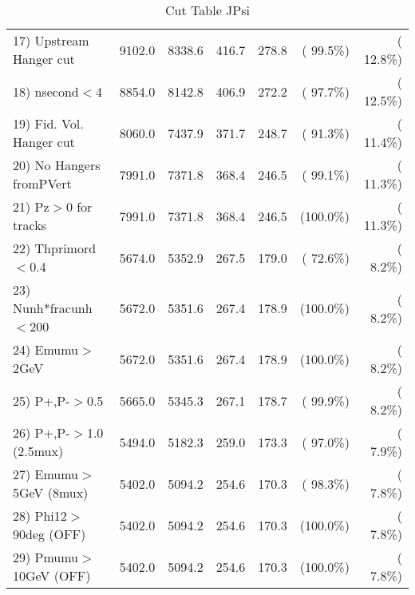 \begin{table}[h!]
\begin{tabular}{||l||r|r|r|r|r|r||}
 17) Upstream Hanger cut  &       9102.0 &       8338.6 &        416.7 &        278.8 & ( 99.5\%) & ( 12.8\%) \\
 18) nsecond$<$4          &       8854.0 &       8142.8 &        406.9 &        272.2 & ( 97.7\%) & ( 12.5\%) \\
 19) Fid. Vol. Hanger cut &       8060.0 &       7437.9 &        371.7 &        248.7 & ( 91.3\%) & ( 11.4\%) \\
 20) No Hangers fromPVert &       7991.0 &       7371.8 &        368.4 &        246.5 & ( 99.1\%) & ( 11.3\%) \\
 21) Pz$>$0 for tracks    &       7991.0 &       7371.8 &        368.4 &        246.5 & (100.0\%) & ( 11.3\%) \\
 22) Thprimord$<$0.4      &       5674.0 &       5352.9 &        267.5 &        179.0 & ( 72.6\%) & (  8.2\%) \\
 23) Nunh*fracunh$<$200   &       5672.0 &       5351.6 &        267.4 &        178.9 & (100.0\%) & (  8.2\%) \\
 24) Emumu$>$2GeV         &       5672.0 &       5351.6 &        267.4 &        178.9 & (100.0\%) & (  8.2\%) \\
 25) P+,P-$>$0.5          &       5665.0 &       5345.3 &        267.1 &        178.7 & ( 99.9\%) & (  8.2\%) \\
 26) P+,P-$>$1.0 (2.5mux) &       5494.0 &       5182.3 &        259.0 &        173.3 & ( 97.0\%) & (  7.9\%) \\
 27) Emumu$>$5GeV  (8mux) &       5402.0 &       5094.2 &        254.6 &        170.3 & ( 98.3\%) & (  7.8\%) \\
 28) Phi12$>$90deg  (OFF) &       5402.0 &       5094.2 &        254.6 &        170.3 & (100.0\%) & (  7.8\%) \\
 29) Pmumu$>$10GeV  (OFF) &       5402.0 &       5094.2 &        254.6 &        170.3 & (100.0\%) & (  7.8\%) \\
 \hline
 \hline
 \end{tabular}
 \caption{Cut Table  JPsi     }
 \label{tab-cutcohjpsi-mumu_cohrhop}
 \end{table}
